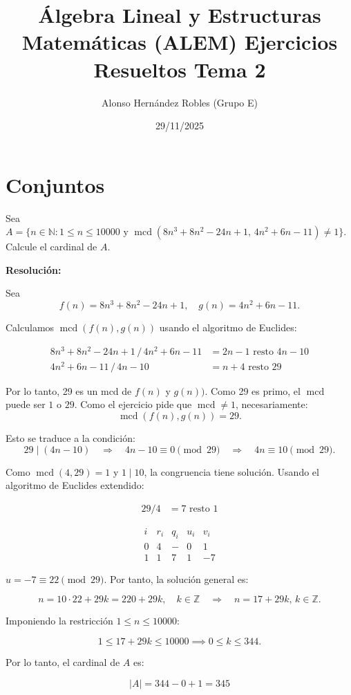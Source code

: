 \documentclass[a4paper,12pt]{article}
\title{Álgebra Lineal y Estructuras Matemáticas (ALEM) Ejercicios Resueltos Tema 2}
\author{Alonso Hernández Robles (Grupo E)}
\date{29/11/2025}
\begin{document}
\maketitle

\tableofcontents
\newpage

\section{Conjuntos}

\begin{ejercicio}[title=Ejercicio 5 (⋆)]
Sea $A = \{n \in \mathbb{N} : 1 \le n \le 10000 \text{ y } \operatorname{mcd}(8n^3 + 8n^2 - 24n + 1,\, 4n^2 + 6n - 11) \neq 1\}$. Calcule el cardinal de $A$.

\tcblower
\textbf{Resolución:}

Sea
\[
f(n) = 8n^3 + 8n^2 - 24n + 1, \quad g(n) = 4n^2 + 6n - 11.
\]

Calculamos $\operatorname{mcd}(f(n),g(n))$ usando el algoritmo de Euclides:

\[
\begin{aligned}
8n^3 + 8n^2 - 24n + 1\,/\,4n^2 + 6n - 11 &= 2n - 1 \text{ resto } 4n - 10\\
4n^2 + 6n - 11\,/\,4n - 10 &= n+4 \text{ resto } 29
\end{aligned}
\]

Por lo tanto, 29 es un mcd de $f(n)$ y $g(n))$. Como 29 es primo, el $\operatorname{mcd}$ puede ser $1$ o $29$.  
Como el ejercicio pide que $\operatorname{mcd} \neq 1$, necesariamente:
\[
\operatorname{mcd}(f(n),g(n)) = 29.
\]

Esto se traduce a la condición:
\[
29 \mid (4n - 10) \quad \Longrightarrow \quad 4n - 10 \equiv 0 \pmod{29} \quad \Longrightarrow \quad 4n \equiv 10 \pmod{29}.
\]

Como $\operatorname{mcd}(4,29) = 1$ y $1\mid10$, la congruencia tiene solución. Usando el algoritmo de Euclides extendido:

\[
\begin{aligned}
29/4 &= 7 \text{ resto } \boxed{1}
\end{aligned}
\]

\[
\begin{array}{c|c|c|c|c}
i & r_i & q_i & u_i & v_i \\
\hline
0 & 4 & - & 0 & 1 \\
1 & \boxed{1} & 7 & 1 & -7
\end{array}
\]

$u = -7 \equiv 22 \pmod{29}$.  
Por tanto, la solución general es:

\[
n = 10 \cdot 22 + 29k = 220 + 29k, \quad k \in \mathbb{Z} \quad \Longrightarrow \quad n = 17 + 29k, \, k \in \mathbb{Z}.
\]

Imponiendo la restricción $1 \le n \le 10000$:

\[
1 \le 17 + 29k \le 10000 \implies 0 \le k \le 344.
\]

Por lo tanto, el cardinal de $A$ es:

\[
|A| = 344 - 0 + 1 = \boxed{345}
\]

\end{ejercicio}
\end{document}
